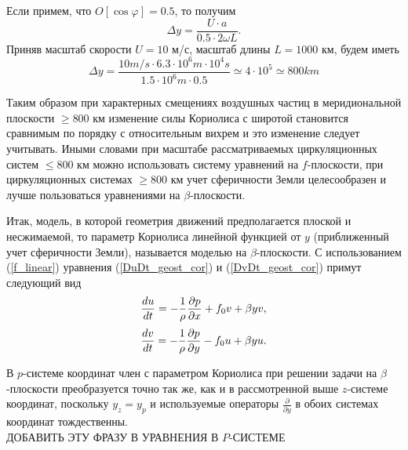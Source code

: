    Если примем, что $O[\cos\varphi]=0.5$, то получим
   \[
   \Delta y = \frac{U \cdot a}{0.5 \cdot 2\omega L}.
   \]
   Приняв масштаб скорости $U=10$ м/с, масштаб длины $L=1000$ км, будем иметь
   \[
   \Delta y = \frac{10 m/s \cdot 6.3 \cdot 10^6 m \cdot 10^4 s}{1.5 \cdot 10^6 m \cdot 0.5} \simeq 4 \cdot 10^5 \simeq 800 km 
   \]
   
   Таким образом при характерных смещениях воздушных частиц в меридиональной плоскости $\geq800$ км изменение силы Кориолиса с широтой становится сравнимым по порядку с относительным вихрем и это изменение следует учитывать. Иными словами при масштабе рассматриваемых циркуляционных систем $\leq800$ км можно использовать систему уравнений на $f$-плоскости, при циркуляционных системах  $\geq800$ км учет сферичности Земли целесообразен и лучше пользоваться уравнениями на $\beta$-плоскости.
   
   Итак, модель, в которой геометрия движений предполагается плоской и несжимаемой, то параметр Кориолиса линейной функцией от $y$ (приближенный учет сферичности Земли), называется моделью на $\beta$-плоскости. С использованием (\ref{f_linear}) уравнения (\ref{DuDt_geost_cor}) и (\ref{DvDt_geost_cor}) примут следующий вид
    \begin{equation}
        \displaystyle\frac{d u}{d t} = -\frac{1}{\rho}\displaystyle\frac{\partial p}{\partial x}+f_0 v+\beta y v, 
    \end{equation} 
    \begin{equation}
        \displaystyle\frac{d v}{d t} = -\frac{1}{\rho}\displaystyle\frac{\partial p}{\partial y}-f_0 u+\beta y u. 
    \end{equation} 
    \begin{warn}
        В $p$-системе координат член с параметром Кориолиса при решении задачи на $\beta$-плоскости преобразуется точно так же, как и в рассмотренной выше $z$-системе координат, поскольку $y_z=y_p$ и используемые операторы $\frac{\partial}{\partial y}$ в обоих системах координат тождественны.\\
        ДОБАВИТЬ ЭТУ ФРАЗУ В УРАВНЕНИЯ В $P$-СИСТЕМЕ
    \end{warn}

